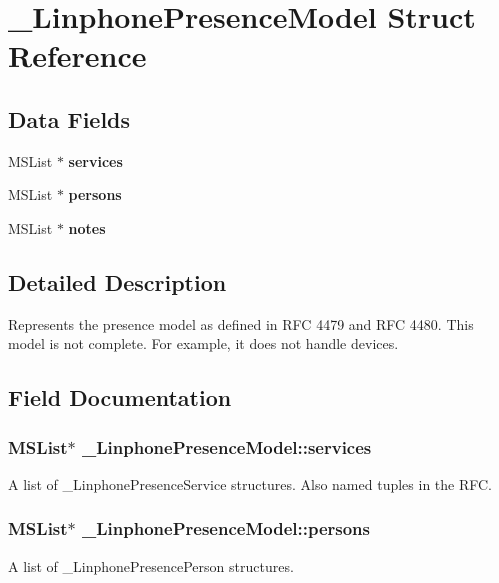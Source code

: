 \section{\-\_\-\-Linphone\-Presence\-Model Struct Reference}
\label{struct__LinphonePresenceModel}
\subsection*{Data Fields}
\begin{DoxyCompactItemize}
\item 
M\-S\-List $\ast$ {\bf services}
\item 
M\-S\-List $\ast$ {\bf persons}
\item 
M\-S\-List $\ast$ {\bf notes}
\end{DoxyCompactItemize}


\subsection{Detailed Description}
Represents the presence model as defined in R\-F\-C 4479 and R\-F\-C 4480. This model is not complete. For example, it does not handle devices. 

\subsection{Field Documentation}
\subsubsection[{services}]{\setlength{\rightskip}{0pt plus 5cm}M\-S\-List$\ast$ \-\_\-\-Linphone\-Presence\-Model\-::services}\label{struct__LinphonePresenceModel_a8905e8352fe395dc985b9bef3d539f28}
A list of \-\_\-\-Linphone\-Presence\-Service structures. Also named tuples in the R\-F\-C. 
\subsubsection[{persons}]{\setlength{\rightskip}{0pt plus 5cm}M\-S\-List$\ast$ \-\_\-\-Linphone\-Presence\-Model\-::persons}\label{struct__LinphonePresenceModel_af6b680a593f0e7e0a85b60efbdc2db11}
A list of \-\_\-\-Linphone\-Presence\-Person structures. 
